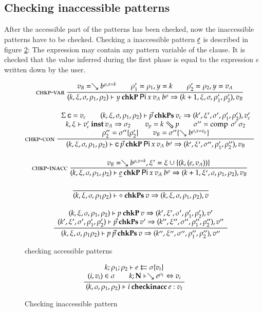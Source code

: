 \subsection{Checking inaccessible patterns}

After the accessible part of the patterns has been checked, now the inaccessible patterns have to be checked.
Checking a inaccessible pattern $\underline{e}$ is described in figure \ref{fphase2}: 
The expression may contain any pattern variable of the clause. 
It is checked that the value inferred during the first phase is equal to the expression $e$ written down by the user.

\begin{figure}[htp]
\begin{gather*}
\nru{\chkpvar}
{v_B = \wh \cl{b}{\ins{\rho}{x}{k}} \qquad \rho'_1 =\ins{\rho_1}{y}{k} \qquad \rho'_2 = \ins{\rho_2}{y}{v_A}}
{
\checkp
{k,\xi,\sigma,\rho_1,\rho_2}
{y}
{\vpi \: x \: v_A \: \cl{b}{\rho}}
{k+1,\xi,\sigma,\rho'_1,\rho'_2}
{v_B}}
\\[2ex]
\nxru{\chkpcon}
{\Sig \: {\cc}=v_c \qquad
\checkps{k,\xi,\sigma,\rho_1,\rho_2}
{\vec{p}}
{v_c}
{k',\xi',\sigma',\rho_1',\rho_2'}
{v'_c}
}
{\unify{k}{\xi}{v'_c}{v_A}{\sigma_2}
\qquad
v_p = \ptv{k}{p}    
\qquad
\sigma'' = \compS{\sigma'}{\sigma_2}
}
{
\rho''_2 = \substEnv{\sigma''}{\rho'_2} \qquad
v_B = \subst{\sigma''}{\wh \cl{b}{\ins{\rho}{x}{v_p}}}
}
{\checkp
{k,\xi,\sigma,\rho_1,\rho_2}
{\cc \: \vec{p}}
{\vpi \: x \: v_A \: \cl{b}{\rho}}
{k',\xi',\sigma'',\rho'_1,\rho''_2}
{v_B}
}
\\[2ex]
\nru{\chkpinacc}
{v_B = \wh \cl{b}{\ins{\rho}{x}{k}} , \xi' = \xi \cup \{ (k,(e,v_A)) \} } 
{
\checkp
{k,\xi,\sigma,\rho_1,\rho_2}
{\inacc{e}}
{\vpi \: x \: v_A \: \cl{b}{\rho}}
{k+1,\xi',\sigma,\rho_1,\rho_2}
{v_B}}
\\[2ex]
\nru{}
{}
{
\checkps
{k,\xi,\sigma,\rho_1\rho_2}
{\diamond}
{v}
{k,\xi,\sigma,\rho_1,\rho_2}
{v}}
\\[2ex]
\ndru{}
{\checkp
{k,\xi,\sigma,\rho_1,\rho_2}
{p}
{v}
{k',\xi',\sigma',\rho'_1,\rho'_2}
{v'}
}
{\checkps
{k',\xi',\sigma',\rho'_1,\rho'_2}
{\vec{p}}
{v'}
{k'',\xi'',\sigma'',\rho''_1,\rho''_2}
{v''}
}
{
\checkps
{k,\xi,\sigma,\rho_1\rho_2}
{p \: \vec{p}}
{v}
{k'',\xi'',\sigma'',\rho''_1,\rho''_2}
{v''}}
\end{gather*}
\caption{checking accessible patterns}
\label{fphase1}
\end{figure}

\begin{figure}[htp]
\begin{gather*}
\ \dfrac{\begin{array}[b]{c}
k;\rho_1;\rho_2\vdash e\leftleftarrows\sigma\{v_t\}
\\
(i,v_i) \in \sigma \qquad k;\mathbf{N}\vdash\searrow e^{\rho_1}\Leftrightarrow v_i
\end{array}}{
(k,\sigma,\rho_1,\rho_2)\vdash i\:\mathbf{checkinacc}\:e : v_t
}
\end{gather*}
\caption{Checking inaccessible pattern}
\label{fphase2}
\end{figure}

